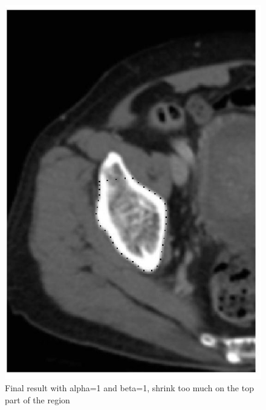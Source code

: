 \documentclass[paper=a4, fontsize=11pt]{scrartcl} %
\numberwithin{equation}{section} %
\numberwithin{figure}{section} %
\numberwithin{table}{subsection} %
\begin{document}
\begin{figure}[!htbp]
	\centering
	\includegraphics[width = 12cm]{p3_3.jpg}
	\caption{Final result with alpha=1 and beta=1, shrink too much on the top part of the region}
\end{figure}
\end{document}
